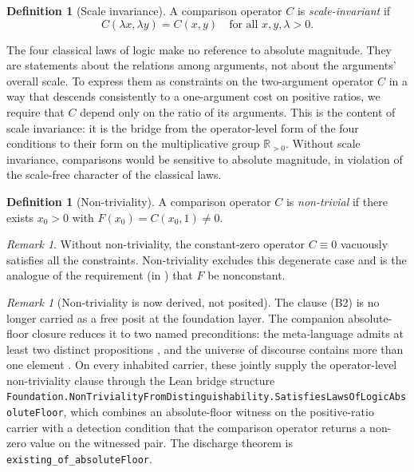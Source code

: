 \documentclass[11pt,a4paper]{article}
\theoremstyle{definition}
\newtheorem{definition}[theorem]{Definition}
\theoremstyle{remark}
\newtheorem{remark}[theorem]{Remark}
\begin{document}
\begin{definition}[Scale invariance]
\label{def:scale-invariance}
A comparison operator $C$ is \emph{scale-invariant} if
\[
C(\lambda x, \lambda y) = C(x, y) \quad \text{for all } x, y, \lambda > 0.
\]
\end{definition}

The four classical laws of logic make no reference to absolute magnitude.
They are statements about the relations among arguments, not about the
arguments' overall scale. To express them as constraints on the
two-argument operator $C$ in a way that descends consistently to a
one-argument cost on positive ratios, we require that $C$ depend only on
the ratio of its arguments. This is the content of scale invariance: it is
the bridge from the operator-level form of the four conditions to their
form on the multiplicative group $\mathbb{R}_{>0}$. Without scale
invariance, comparisons would be sensitive to absolute magnitude, in
violation of the scale-free character of the classical laws.

\begin{definition}[Non-triviality]
\label{def:nontriviality}
A comparison operator $C$ is \emph{non-trivial} if there exists $x_0 > 0$
with $F(x_0) = C(x_0, 1) \neq 0$.
\end{definition}

\begin{remark}
Without non-triviality, the constant-zero operator $C \equiv 0$ vacuously
satisfies all the constraints. Non-triviality excludes this degenerate
case and is the analogue of the requirement (in
\cite{WashburnZlatanovicAllahyarov2026}) that $F$ be nonconstant.
\end{remark}

\begin{remark}[Non-triviality is now derived, not posited]
\label{rem:nontriviality-derived}
The clause (B2) is no longer carried as a free posit at the foundation
layer. The companion absolute-floor closure
\cite{Washburn2026FloorClosure} reduces it to two named preconditions:
the meta-language admits at least two distinct propositions
\cite{Washburn2026SelfBootstrap}, and the universe of discourse
contains more than one element \cite{Washburn2026Specifiability}. On
every inhabited carrier, these jointly supply the operator-level
non-triviality clause through the Lean bridge structure
\texttt{Foundation.NonTrivialityFromDistinguishability.SatisfiesLawsOfLogicAbsoluteFloor},
which combines an absolute-floor witness on the positive-ratio
carrier with a detection condition that the comparison operator
returns a non-zero value on the witnessed pair. The discharge theorem
is \texttt{existing\_of\_absoluteFloor}.
\end{remark}
\end{document}
